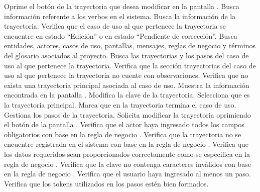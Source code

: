  \begin{UCtrayectoria}
	\UCpaso[\UCactor] Oprime el botón \btnEditar de la trayectoria que desea modificar en la pantalla . 
	\UCpaso[\UCsist] Busca información referente a los verbos en el sistema. 
	\UCpaso[\UCsist] Busca la información de la trayectoria.	
	\UCpaso[\UCsist] Verifica que el caso de uso al que pertenece la trayectoria se encuentre en estado ``Edición'' o en estado ``Pendiente de corrección''.
	\UCpaso[\UCsist] Busca entidades, actores, casos de uso, pantallas, mensajes, reglas de negocio y términos del glosario asociados al proyecto.
	\UCpaso[\UCsist] Busca las trayectorias y los pasos del caso de uso al que pertenece la trayectoria.
	\UCpaso[\UCsist] Verifica que la sección trayectorias del caso de uso al que pertenece la trayectoria no cuente con observaciones. 
	\UCpaso[\UCsist] Verifica que no exista una trayectoria principal asociada al caso de uso.  
	\UCpaso[\UCsist] Muestra la información encontrada en la pantalla . \label{cu5.1.1.2:muestra}
	\UCpaso[\UCactor] Modifica la clave de la trayectoria.
	\UCpaso[\UCactor] Selecciona que es la trayectoria principal.  \label{cu5.1.1.2:ingresaDatos}
	\UCpaso[\UCsist] Marca que en la trayectoria termina el caso de uso.
	\UCpaso[\UCactor] Gestiona los pasos de la trayectoria. \label{cu5.1.1.2:gestionaPasos}
	\UCpaso[\UCactor] Solicita modificar la trayectoria oprimiendo el botón  de la pantalla .  
	\UCpaso[\UCsist] Verifica que el actor haya ingresado todos los campos obligatorios con base en la regla de negocio . 
	\UCpaso[\UCsist] Verifica que la trayectoria no se encuentre registrada en el sistema con base en la regla de negocio . 
	\UCpaso[\UCsist] Verifica que los datos requeridos sean proporcionados correctamente como se especifica en la regla de negocio .  
	\UCpaso[\UCsist] Verifica que la clave no contenga caracteres inválidos con base en la regla de negocio . 	
	\UCpaso[\UCsist] Verifica que el usuario haya ingresado al menos un paso. 
	\UCpaso[\UCsist] Verifica que los tokens utilizados en los pasos estén bien formados. 

\end{UCtrayectoria}
